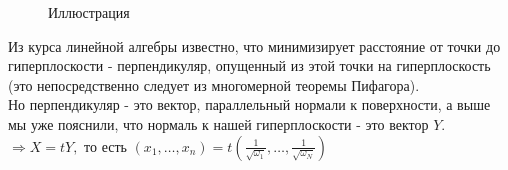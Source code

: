 \documentclass[12pt,a4paper]{article}
\begin{document}
 \begin{figure}[h!]
\caption{ Иллюстрация}
\label{fig:image}
\end{figure}




Из курса линейной алгебры известно, что минимизирует расстояние от точки до гиперплоскости - перпендикуляр, опущенный из этой точки на гиперплоскость (это непосредственно следует из многомерной  теоремы Пифагора).\\
 Но перпендикуляр - это вектор, параллельный нормали к поверхности, а  выше мы уже пояснили, что нормаль к  нашей гиперплоскости - это вектор $Y$.\\
 
 
$\Rightarrow X=tY,$ то есть $(x_1, \dots, x_n) = t(\frac{1}{\sqrt {\omega_1} }, \ldots, \frac{1}{\sqrt {\omega_N}} )$\\
\end{document}
